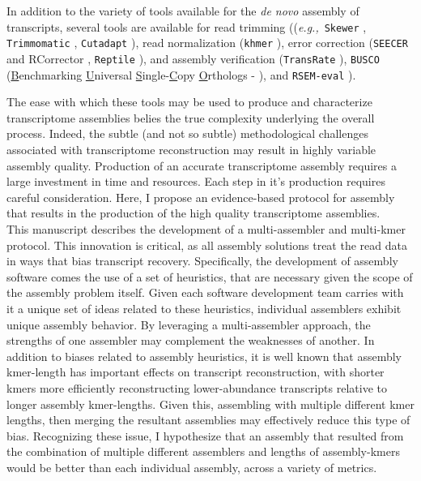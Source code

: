 \documentclass[10pt,letterpaper]{article}
\newcommand{\tit}{\textit}
\newcommand{\eg}{\textit{e.g.,}}
\begin{document}
In addition to the variety of tools available for the \tit{de novo} assembly of transcripts, several tools are available for read trimming ((\eg\ \texttt{Skewer} \citep{Jiang:2014cx}, \texttt{Trimmomatic} \citep{Bolger:2014ek}, \texttt{Cutadapt} \cite{Martin:2011va}), read normalization (\texttt{khmer} \citep{Pell:2012id}), error correction (\texttt{SEECER} \citep{Le:2013dy} and RCorrector \citep{Song:2015in}, \texttt{Reptile} \cite{Yang:2010kv}), and assembly verification (\texttt{TransRate} \citep{SmithUnna:2016go}), \texttt{BUSCO} (\underline{B}enchmarking \underline{U}niversal \underline{S}ingle-\underline{C}opy \underline{O}rthologs - \citep{Simao:2015kk}), and \texttt{RSEM-eval} \citep{Li:2014cm}). 

The ease with which these tools may be used to produce and characterize transcriptome assemblies belies the true complexity underlying the overall process. Indeed, the subtle (and not so subtle) methodological challenges associated with transcriptome reconstruction may result in highly variable assembly quality. Production of an accurate transcriptome assembly requires a large investment in time and resources. Each step in it's production requires careful consideration. Here, I propose an evidence-based protocol for assembly that results in the production of the high quality transcriptome assemblies. \\

This manuscript describes the development of a multi-assembler and multi-kmer protocol. This innovation is critical, as all assembly solutions treat the read data in ways that bias transcript recovery. Specifically, the development of assembly software comes the use of a set of heuristics, that are necessary given the scope of the assembly problem itself. Given each software development team carries with it a unique set of ideas related to these heuristics, individual assemblers exhibit unique assembly behavior. By leveraging a multi-assembler approach, the strengths of one assembler may complement the weaknesses of another. In addition to biases related to assembly heuristics, it is well known that assembly kmer-length has important effects on transcript reconstruction, with shorter kmers more efficiently reconstructing lower-abundance transcripts relative to longer assembly kmer-lengths. Given this, assembling with multiple different kmer lengths, then merging the resultant assemblies may effectively reduce this type of bias. Recognizing these issue, I hypothesize that an assembly that resulted from the combination of multiple different assemblers and lengths of assembly-kmers would be better than each individual assembly, across a variety of metrics. 
\end{document}
